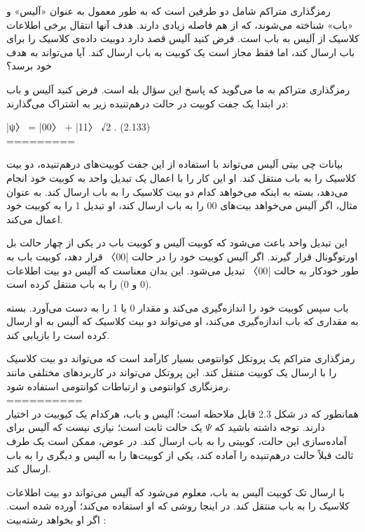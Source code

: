 \documentclass{book}
\begin{document}
رمزگذاری متراکم شامل دو طرفین است که به طور معمول به عنوان «آلیس» و «باب» شناخته می‌شوند، که از هم فاصله زیادی دارند. هدف آنها انتقال برخی اطلاعات کلاسیک از آلیس به باب است. فرض کنید آلیس قصد دارد دوبیت داده‌ی کلاسیک را برای باب ارسال کند، اما فقط مجاز است یک کوبیت به باب ارسال کند. آیا می‌تواند به هدف خود برسد؟

رمزگذاری متراکم به ما می‌گوید که پاسخ این سؤال بله است. فرض کنید آلیس و باب در ابتدا یک جفت کوبیت در حالت درهم‌تنیده زیر به اشتراک می‌گذارند:

|ψ〉 = |00〉 + |11〉
√2 . (2.133)\\
=========

بیانات چی بیتی
آلیس می‌تواند با استفاده از این جفت کوبیت‌های درهم‌تنیده، دو بیت کلاسیک را به باب منتقل کند. او این کار را با اعمال یک تبدیل واحد به کوبیت خود انجام می‌دهد، بسته به اینکه می‌خواهد کدام دو بیت کلاسیک را به باب ارسال کند. به عنوان مثال، اگر آلیس می‌خواهد بیت‌های 00 را به باب ارسال کند، او تبدیل 1 را به کوبیت خود اعمال می‌کند.

این تبدیل واحد باعث می‌شود که کوبیت آلیس و کوبیت باب در یکی از چهار حالت بل اورتوگونال قرار گیرند. اگر آلیس کوبیت خود را در حالت |00〉 قرار دهد، کوبیت باب به طور خودکار به حالت |00〉 تبدیل می‌شود. این بدان معناست که آلیس دو بیت اطلاعات (0 و 0) را به باب منتقل کرده است.

باب سپس کوبیت خود را اندازه‌گیری می‌کند و مقدار 0 یا 1 را به دست می‌آورد. بسته به مقداری که باب اندازه‌گیری می‌کند، او می‌تواند دو بیت کلاسیک که آلیس به او ارسال کرده است را بازیابی کند.

رمزگذاری متراکم یک پروتکل کوانتومی بسیار کارآمد است که می‌تواند دو بیت کلاسیک را با ارسال یک کوبیت منتقل کند. این پروتکل می‌تواند در کاربردهای مختلفی مانند رمزنگاری کوانتومی و ارتباطات کوانتومی استفاده شود.\\
==========\\

همانطور که در شکل 2.3 قابل ملاحظه است؛ آلیس و باب، هرکدام یک کیوبیت در اختیار دارند. توجه داشته باشید که $\Psi$ یک حالت ثابت است؛ نیازی نیست که آلیس برای آماده‌سازی این حالت، کوبیتی را به باب ارسال کند. در عوض، ممکن است یک طرف ثالث قبلاً حالت درهم‌تنیده را آماده کند، یکی از کوبیت‌ها را به آلیس و دیگری را به باب ارسال کند.

با ارسال تک کوبیت آلیس  به باب، معلوم می‌شود که آلیس می‌تواند دو بیت اطلاعات کلاسیک را به باب منتقل کند. در اینجا روشی که او استفاده می‌کند؛ آورده شده است. اگر او بخواهد رشته‌بیت :
\end{document}
